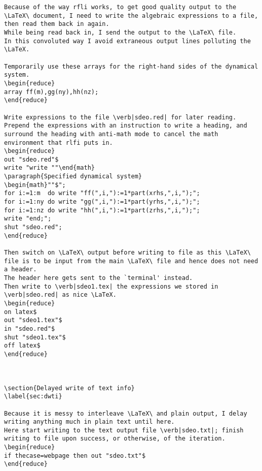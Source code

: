 \documentclass[11pt,a5paper]{article}
\begin{document}
\begin{reduce}
\begin{verbatim}
Because of the way rfli works, to get good quality output to the \LaTeX\ document, I need to write the algebraic expressions to a file, then read them back in again.
While being read back in, I send the output to the \LaTeX\ file.
In this convoluted way I avoid extraneous output lines polluting the \LaTeX. 

Temporarily use these arrays for the right-hand sides of the dynamical system.
\begin{reduce}
array ff(m),gg(ny),hh(nz);
\end{reduce}

Write expressions to the file \verb|sdeo.red| for later reading.
Prepend the expressions with an instruction to write a heading, and surround the heading with anti-math mode to cancel the math environment that rlfi puts in.
\begin{reduce}
out "sdeo.red"$
write "write ""\end{math}
\paragraph{Specified dynamical system}
\begin{math}""$";
for i:=1:m  do write "ff(",i,"):=1*part(xrhs,",i,");"; 
for i:=1:ny do write "gg(",i,"):=1*part(yrhs,",i,");";
for i:=1:nz do write "hh(",i,"):=1*part(zrhs,",i,");"; 
write "end;";
shut "sdeo.red";
\end{reduce}

Then switch on \LaTeX\ output before writing to file as this \LaTeX\ file is to be input from the main \LaTeX\ file and hence does not need a header.
The header here gets sent to the `terminal' instead.
Then write to \verb|sdeo1.tex| the expressions we stored in \verb|sdeo.red| as nice \LaTeX.
\begin{reduce}
on latex$
out "sdeo1.tex"$
in "sdeo.red"$
shut "sdeo1.tex"$
off latex$
\end{reduce}



\section{Delayed write of text info}
\label{sec:dwti}

Because it is messy to interleave \LaTeX\ and plain output, I delay writing anything much in plain text until here.
Here start writing to the text output file \verb|sdeo.txt|; finish writing to file upon success, or otherwise, of the iteration.
\begin{reduce}
if thecase=webpage then out "sdeo.txt"$
\end{reduce}


\end{verbatim}
\end{reduce}
\end{document}
